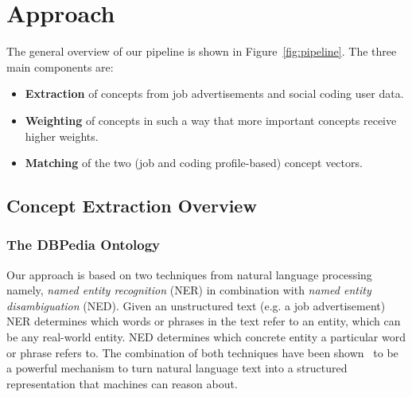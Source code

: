 \documentclass[conference]{IEEEtran}
\begin{document}

\section{Approach}

The general overview of our pipeline is shown in Figure~\ref{fig:pipeline}.
The three main components are:

\begin{itemize}

  \item \textbf{Extraction} of concepts from job advertisements and social
    coding user data.

  \item \textbf{Weighting} of concepts in such a way that more important
    concepts receive higher weights.

  \item \textbf{Matching} of the two (job and coding profile-based) concept
    vectors.

\end{itemize}

\subsection{Concept Extraction Overview}


\subsubsection{The DBPedia Ontology}
Our approach is based on two techniques from natural language processing namely,
\emph{named entity recognition} (NER) in combination with \emph{named entity
disambiguation} (NED). Given an unstructured text (e.g. a job advertisement) NER determines which words or phrases in the text refer to an
entity, which can be any real-world entity. NED
determines which concrete entity a particular word or phrase refers to.  The
combination of both techniques have been shown~\cite{aggarwal2012mining} to be a
powerful mechanism to turn natural language text into a structured representation
that machines can reason about.
\end{document}
